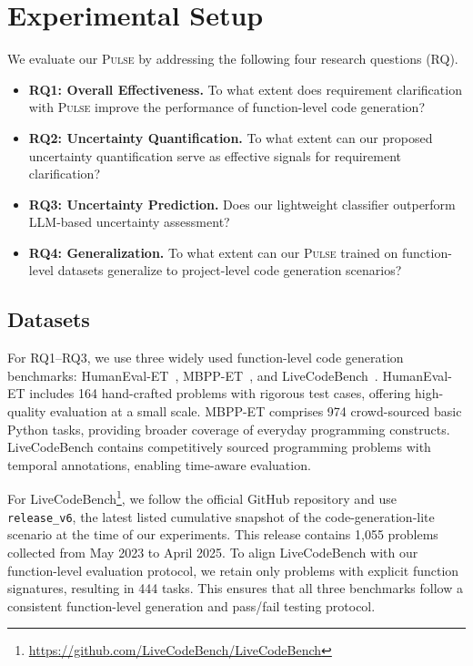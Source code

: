 \section{Experimental Setup}\label{sec:setup}



We evaluate our \textsc{Pulse} by addressing the following four research questions (RQ).
\begin{itemize}[leftmargin=1em]
\item \textbf{RQ1: Overall Effectiveness.}
To what extent does requirement clarification with \textsc{Pulse} improve the performance of function-level code generation?
\item \textbf{RQ2: Uncertainty Quantification.}
To what extent can our proposed uncertainty quantification serve as effective signals for requirement clarification?
\item \textbf{RQ3: Uncertainty Prediction.}
Does our lightweight classifier outperform LLM-based uncertainty assessment?
\item \textbf{RQ4: Generalization.}
To what extent can our \textsc{Pulse} trained on function-level datasets generalize to project-level code generation scenarios?
\end{itemize}



\subsection{Datasets}
For RQ1--RQ3, we use three widely used function-level code generation benchmarks: HumanEval-ET~\cite{humaneval}, MBPP-ET~\cite{mbpp}, and LiveCodeBench~\cite{jain2025livecodebench}. HumanEval-ET includes 164 hand-crafted problems with rigorous test cases, offering high-quality evaluation at a small scale. MBPP-ET comprises 974 crowd-sourced basic Python tasks, providing broader coverage of everyday programming constructs. LiveCodeBench contains competitively sourced programming problems with temporal annotations, enabling time-aware evaluation. 

For LiveCodeBench\footnote{\url{https://github.com/LiveCodeBench/LiveCodeBench}}, we follow the official GitHub repository and use \texttt{release\_v6}, the latest listed cumulative snapshot of the code-generation-lite scenario at the time of our experiments. This release contains 1,055 problems collected from May 2023 to April 2025. To align LiveCodeBench with our function-level evaluation protocol, we retain only problems with explicit function signatures, resulting in 444 tasks. This ensures that all three benchmarks follow a consistent function-level generation and pass/fail testing protocol.


